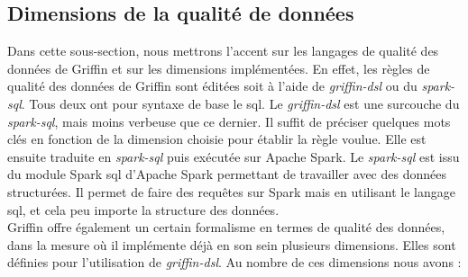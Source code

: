 \subsection{Dimensions de la qualit\'e de donn\'ees}
 Dans cette sous-section, nous mettrons l'accent sur les langages de qualit\'e des donn\'ees de Griffin et sur les dimensions impl\'ement\'ees. En effet, les règles de qualit\'e des donn\'ees de Griffin sont \'edit\'ees soit \`a l'aide de  \emph{griffin-dsl} ou du \emph{spark-sql}. Tous deux ont pour syntaxe de base le \acrshort{sql}. Le \emph{griffin-dsl} est une surcouche du \emph{spark-sql}, mais moins verbeuse que ce dernier. Il suffit de pr\'eciser quelques mots cl\'es en fonction de la dimension choisie pour \'etablir la r\`egle voulue. Elle est ensuite traduite en \emph{spark-sql} puis ex\'ecut\'ee sur Apache Spark. Le \emph{spark-sql} est issu du module Spark \acrshort{sql} d'Apache Spark permettant de travailler avec des données structurées. Il permet de faire des requ\^etes sur Spark mais en utilisant le langage \acrshort{sql}, et cela peu importe la structure des donn\'ees. \\

Griffin offre \'egalement un certain formalisme en termes de qualit\'e des donn\'ees, dans la mesure o\`u il impl\'emente déjà en son sein plusieurs dimensions. Elles sont d\'efinies pour l'utilisation de \emph{griffin-dsl}. Au nombre de ces dimensions nous avons : 

